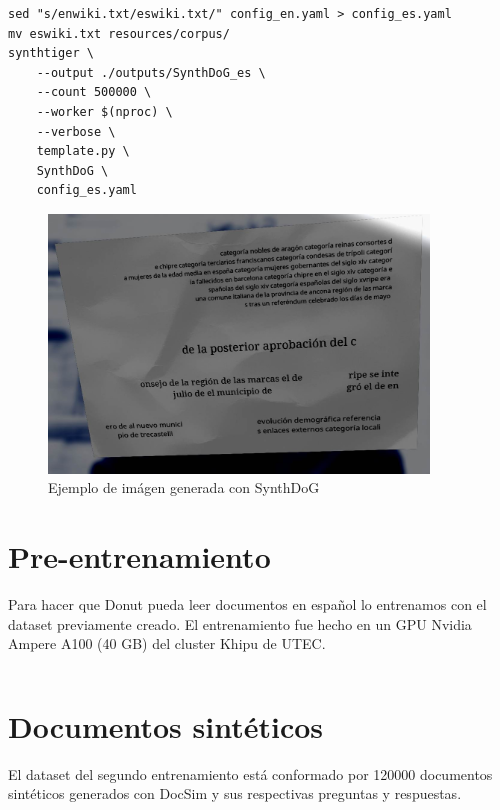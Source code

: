\documentclass[../main.tex]{subfiles}
\begin{document}
\begin{verbatim}
sed "s/enwiki.txt/eswiki.txt/" config_en.yaml > config_es.yaml
mv eswiki.txt resources/corpus/
synthtiger \
	--output ./outputs/SynthDoG_es \
	--count 500000 \
	--worker $(nproc) \
	--verbose \
	template.py \
	SynthDoG \
	config_es.yaml
\end{verbatim}

\begin{figure}[H]
	\centering
	\includegraphics[width=0.9\textwidth]{image_475821.jpg}
	\caption{Ejemplo de imágen generada con SynthDoG}
\end{figure}

\section{Pre-entrenamiento}

Para hacer que Donut pueda leer documentos en español
lo entrenamos con el dataset previamente creado.
El entrenamiento fue hecho en un GPU Nvidia Ampere A100 (40 GB) del cluster Khipu de UTEC.

\inputminted[bgcolor=codeBack, tabsize=2]{bash}{train-es.sh}

\section{Documentos sintéticos}
El dataset del segundo entrenamiento está conformado por 120000 documentos sintéticos generados con DocSim\cite{DocSim} y sus respectivas preguntas y respuestas.
\end{document}
